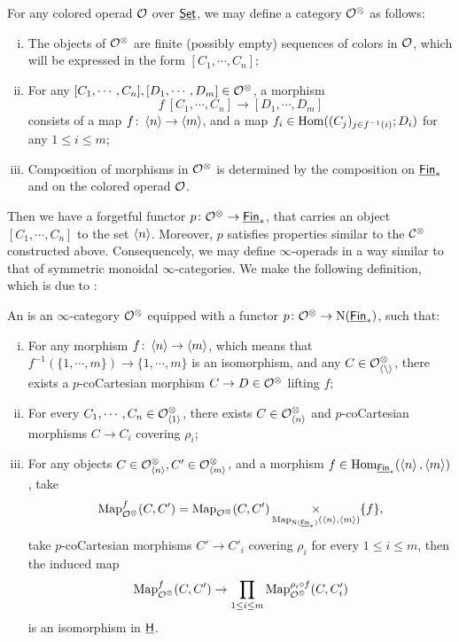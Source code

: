 \documentclass[twoside]{article}
\begin{document}
\begin{construction}\label{constr}
    For any colored operad
    $\cal O$ over $\underline{\smash{\mathsf{Set}}}$, we may define a category $\cal O^\otimes$ as follows:
    
    \begin{enumerate}[i)]
        \item The objects of $\cal O^\otimes$ are finite (possibly empty) sequences
        of colors in $\cal O$, which will be expressed in the form $[C_1,\cdots,C_n]$;
    
        \item For any $[C_1,\cdots,C_n],[D_1,\cdots,D_m]\in\cal O^\otimes$, a morphism
        \[f\:[C_1,\cdots,C_n]\to[D_1,\cdots,D_m]\] consists of a map $f\colon\left<n\right>\to\left<m\right>$, 
        and a map $f_i\in\operatorname{Hom}((C_j)_{j\in f^{-1}(i)};D_i)$ for any $1\le i\le m$;
    
        \item Composition of morphisms in $\cal O^\otimes$ is determined by
        the composition on $\underline{\smash{\mathsf{Fin}}}_*$ and on the colored operad $\cal O$.
    \end{enumerate}
\end{construction}

Then we have a forgetful functor $p\colon\cal O^\otimes\to\underline{\smash{\mathsf{Fin}}}_*$, 
that carries an object $[C_1,\cdots,C_n]$ to the set
$\left<n\right>$. Moreover, $p$ satisfies properties similar to the $\cal C^\otimes$
constructed above. Consequencely, we may define $\infty$-operads in a way
similar to that of symmetric monoidal $\infty$-categories. We make the following
definition, which is due to \cite{Lur16}:

\begin{definition}
    An  is an $\infty$-category $\cal O^\otimes$ equipped with 
    a functor $p\colon\cal O^\otimes\to\mathrm{N}(\underline{\smash{\mathsf{Fin}}}_*)$, such that:
    \begin{enumerate}[i)]
        \item For any  morphism $f\colon\left<n\right>\to\left<m\right>$, which means that
        $f^{-1}(\{1,\cdots,m\})\to\{1,\cdots,m\}$ is an isomorphism, 
        and any $C\in\cal O^\otimes_{\left<n\right>}$, there exists
        a $p$-coCartesian morphism $C\to D\in\cal O^\otimes$ lifting $f$;

        \item For every $C_1,\cdots,C_n\in\mathcal O^\otimes_{\left<1\right>}$, there exists 
        $C\in\mathcal O^\otimes_{\left<n\right>}$ and $p$-coCartesian morphisms $C\to C_i$ covering 
        $\rho_i$;

        \item For any objects $C\in\mathcal O^\otimes_{\left<n\right>},C'\in\mathcal O^\otimes_{\left<m\right>}$,
        and a morphism $f\in\operatorname{Hom}_{\underline{\smash{\mathsf{Fin}}}_*}(\left<n\right>,\left<m\right>)$, take
        \[\operatorname{Map}_{\cal O^\otimes}^f(C,C')=\operatorname{Map}_{\cal O^\otimes}(C,C')
        \mathop{\operatorname{\times}}\limits_{\operatorname{Map}_{\mathrm{N}(\underline{\smash{\mathsf{Fin}}}_*)}(\left<n\right>,\left<m\right>)}\{f\},\]
        take $p$-coCartesian morphisms $C'\to C'_i$ covering $\rho_i$ 
        for every $1\le i\le m$, then the induced map \[\operatorname{Map}_{\cal O^\otimes}^f(C,C')\to
        \prod_{1\le i\le m}\operatorname{Map}_{\cal O^\otimes}^{\rho_i\circ f}(C,C_i')\] is an isomorphism
        in $\underline{\smash{\mathsf{H}}}$.
    \end{enumerate}
\end{definition}
\end{document}

